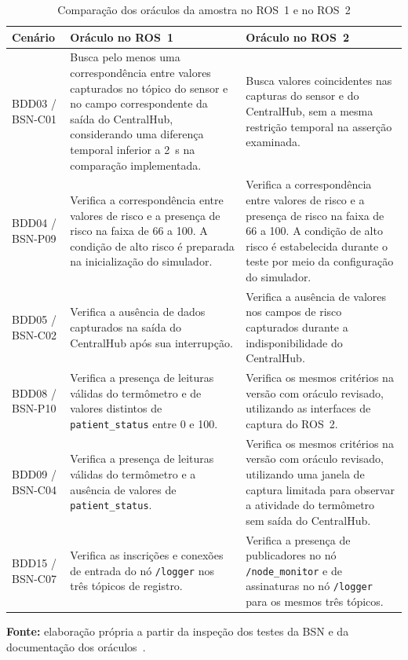 \begin{table}[htbp]
\centering
\footnotesize
\caption{Comparação dos oráculos da amostra no ROS~1 e no ROS~2}
\label{tab:gt-validacao-oraculos}
\begin{tabularx}{\textwidth}{@{}p{}XX@{}}
\toprule
\textbf{Cenário} & \textbf{Oráculo no ROS~1} & \textbf{Oráculo no ROS~2} \\
\midrule
BDD03 / BSN-C01 & Busca pelo menos uma correspondência entre valores capturados no tópico do sensor e no campo correspondente da saída do CentralHub, considerando uma diferença temporal inferior a 2~s na comparação implementada. & Busca valores coincidentes nas capturas do sensor e do CentralHub, sem a mesma restrição temporal na asserção examinada. \\
\addlinespace
BDD04 / BSN-P09 & Verifica a correspondência entre valores de risco e a presença de risco na faixa de 66 a 100. A condição de alto risco é preparada na inicialização do simulador. & Verifica a correspondência entre valores de risco e a presença de risco na faixa de 66 a 100. A condição de alto risco é estabelecida durante o teste por meio da configuração do simulador. \\
\addlinespace
BDD05 / BSN-C02 & Verifica a ausência de dados capturados na saída do CentralHub após sua interrupção. & Verifica a ausência de valores nos campos de risco capturados durante a indisponibilidade do CentralHub. \\
\addlinespace
BDD08 / BSN-P10 & Verifica a presença de leituras válidas do termômetro e de valores distintos de \texttt{patient\_status} entre 0 e 100. & Verifica os mesmos critérios na versão com oráculo revisado, utilizando as interfaces de captura do ROS~2. \\
\addlinespace
BDD09 / BSN-C04 & Verifica a presença de leituras válidas do termômetro e a ausência de valores de \texttt{patient\_status}. & Verifica os mesmos critérios na versão com oráculo revisado, utilizando uma janela de captura limitada para observar a atividade do termômetro sem saída do CentralHub. \\
\addlinespace
BDD15 / BSN-C07 & Verifica as inscrições e conexões de entrada do nó \texttt{/logger} nos três tópicos de registro. & Verifica a presença de publicadores no nó \texttt{/node\_monitor} e de assinaturas no nó \texttt{/logger} para os mesmos três tópicos. \\
\bottomrule
\end{tabularx}
\par\smallskip
{\footnotesize\textbf{Fonte:} elaboração própria a partir da inspeção dos testes da BSN e da documentação dos oráculos~\cite{Viana}.}
\end{table}
\FloatBarrier

